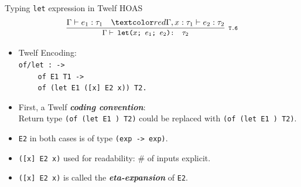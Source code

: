 \documentclass{beamer}
\renewcommand{\emph}[1]{\textbf{\textit{#1}}}
\begin{document}
\begin{frame}{Typing \texttt{let} expression in Twelf HOAS}
\[
\cinfer[T.6]{$\Gamma \vdash$ let($x$; $e_1$; $e_2$): $\tau_2$}
  {\Gamma \vdash e_1: \tau_1
   &
   \cemph{\Gamma , x : \tau_1 \vdash e_2 : \tau_2}
  }
\]
\begin{itemize}
\item Twelf Encoding: \\
\texttt{of/let :  ->} \\
$\qquad$ \texttt{of E1 T1 ->} \\
$\qquad$ \texttt{of (let E1 ([x] E2 x)) T2.}

\pause
\item First, a Twelf \emph{coding convention}: \\
Return type \texttt{(of (let E1 ) T2)}
could be replaced with
\texttt{(of (let E1 ) T2)}.

\item \texttt{E2} in both cases is of type \texttt{(exp -> exp)}.

\item \texttt{([x] E2 x)} used for readability: \# of inputs explicit.

\item \texttt{([x] E2 x)} is called the \emph{eta-expansion}
of \texttt{E2}.

\end{itemize}
\end{frame}
\end{document}
